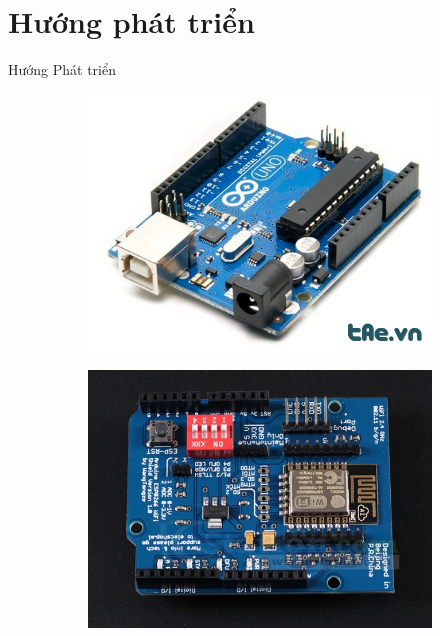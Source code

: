 \documentclass[compress]{beamer}
\begin{document}
\section*{Hướng phát triển}
\begin{frame}{Hướng Phát triển}
\begin{figure}[h]
\begin{subfigure}{.3\textwidth}
  \centering
  \includegraphics[width=1\linewidth]{../uno.jpg}
  \label{fig:sfig1}
\end{subfigure}%
\begin{subfigure}{.3\textwidth}
  \centering
  \includegraphics[width=1\linewidth]{../esp.jpg}

\end{subfigure}
\end{figure}
\end{frame}
\end{document}
